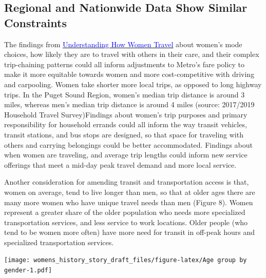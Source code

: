 \documentclass[
  12pt,
]{article}
\begin{document}
\hypertarget{regional-and-nationwide-data-show-similar-constraints}{%
\subsection{Regional and Nationwide Data Show Similar
Constraints}\label{regional-and-nationwide-data-show-similar-constraints}}

\begin{flushleft}
The findings from \href{https://thesource.metro.net/2019/09/19/metro-releases-understanding-how-women-travel-report/}{\underline{\textcolor{blue}{Understanding How Women Travel}}} about women’s mode choices, how likely they are to travel with others in their care, and their complex trip-chaining patterns could all inform adjustments to Metro’s fare policy to make it more equitable towards women and more cost-competitive with driving and carpooling. Women take shorter more local trips, as opposed to long highway trips. In the Puget Sound Region, women's median trip distance is around 3 miles, whereas men's median trip distance is around 4 miles (source: 2017/2019 Household Travel Survey)Findings about women’s trip purposes and primary responsibility for household errands could all inform the way transit vehicles, transit stations, and bus stops are designed, so that space for traveling with others and carrying  belongings could be better accommodated. Findings about when women are traveling, and average trip lengths could inform new service offerings that meet a mid-day peak travel demand and more local service. 
\end{flushleft}

\begin{flushleft}
Another consideration for amending transit and transportation access is that, women on average, tend to live longer than men, so that at older ages there are many more women who have unique travel needs than men (Figure 8). Women represent a greater share of the older population who needs more specialized transportation services, and less service to work locations.  Older people (who tend to be women more often) have more need for transit in off-peak hours and specialized transportation services. 
\end{flushleft}

\texttt{[image: womens\_history\_story\_draft\_files/figure-latex/Age group by gender-1.pdf]}

\newpage
\pagestyle{otherpages}
\setlength{\headheight}{10pt}
\setlength{\textheight}{665pt}
\fancyhead[L]{}
\end{document}
